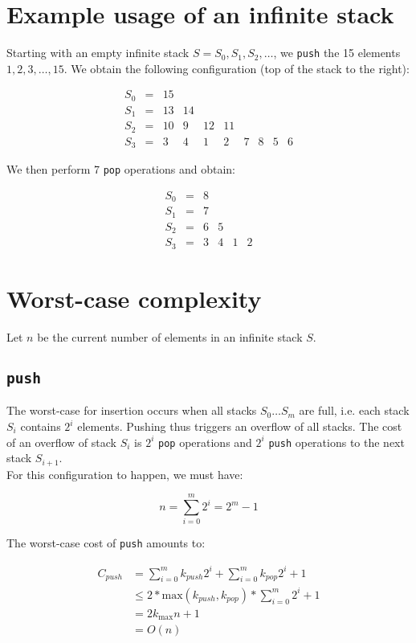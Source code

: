 \section{Example usage of an infinite stack}
Starting with an empty infinite stack $S = S_0, S_1, S_2, \ldots$, we \texttt{push} the 15 elements $1, 2, 3,\ldots, 15$. We obtain the following configuration (top of the stack to the right):

\[
\begin{array}{lcccccccccc}
  S_0 & = & 15\\
  S_1 & = & 13 & 14\\
  S_2 & = & 10 & 9 & 12 & 11\\
  S_3 & = & 3 & 4 & 1 & 2 & 7 & 8 & 5 & 6
\end{array}
\]

We then perform 7 \texttt{pop} operations and obtain:

\[
\begin{array}{lcccccccccc}
  S_0 & = & 8\\
  S_1 & = & 7\\
  S_2 & = & 6 & 5 &\\
  S_3 & = & 3 & 4 & 1 & 2
\end{array}
\]

\section{Worst-case complexity}
Let $n$ be the current number of elements in an infinite stack $S$.

  \subsection{\texttt{push}}
  \label{worst-case-push}
  The worst-case for insertion occurs when all stacks $S_0\ldots S_m$ are full, i.e. each stack $S_i$ contains $2^i$ elements. Pushing thus triggers an overflow of all stacks. The cost of an overflow of stack $S_i$ is $2^i$ \texttt{pop} operations and $2^i$ \texttt{push} operations to the next stack $S_{i+1}$.\\
  For this configuration to happen, we must have:

  \[
    n = \sum_{i=0}^m 2^i = 2^m - 1
  \]

  The worst-case cost of \texttt{push} amounts to:

  \[
  \begin{array}{ll}
    C_{push} & = \sum_{i=0}^m k_{push} 2^i + \sum_{i=0}^m k_{pop} 2^i + 1\\
             & \leq 2 * \text{max}(k_{push}, k_{pop}) * \sum_{i=0}^m 2^i + 1\\
             & = 2 k_{\text{max}} n + 1\\
             & = O(n)
  \end{array}
  \]

